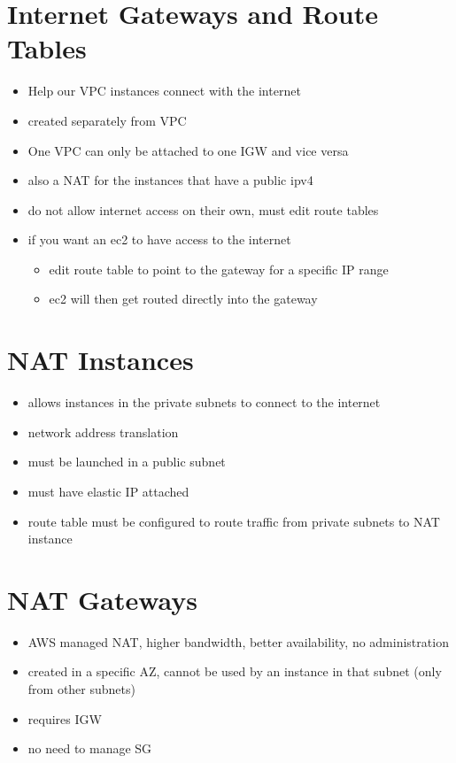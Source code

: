 \documentclass[]{scrartcl}
\begin{document}
\section{Internet Gateways and Route Tables}
\begin{itemize}
	\item Help our VPC instances connect with the internet
	\item created separately from VPC
	\item One VPC can only be attached to one IGW and vice versa
	\item also a NAT for the instances that have a public ipv4
	\item do not allow internet access on their own, must edit route tables
	\item if you want an ec2 to have access to the internet
	\begin{itemize}
		\item edit route table to point to the gateway for a specific IP range
		\item ec2 will then get routed directly into the gateway
	\end{itemize}
\end{itemize}

\section{NAT Instances}
\begin{itemize}
	\item allows instances in the private subnets to connect to the internet
	\item network address translation
	\item must be launched in a public subnet
	\item must have elastic IP attached
	\item route table must be configured to route traffic from private subnets to NAT instance
\end{itemize}

\section{NAT Gateways}
\begin{itemize}
	\item AWS managed NAT, higher bandwidth, better availability, no administration
	\item created in a specific AZ, cannot be used by an instance in that subnet (only from other subnets)
	\item requires IGW
	\item no need to manage SG
\end{itemize}
\end{document}
